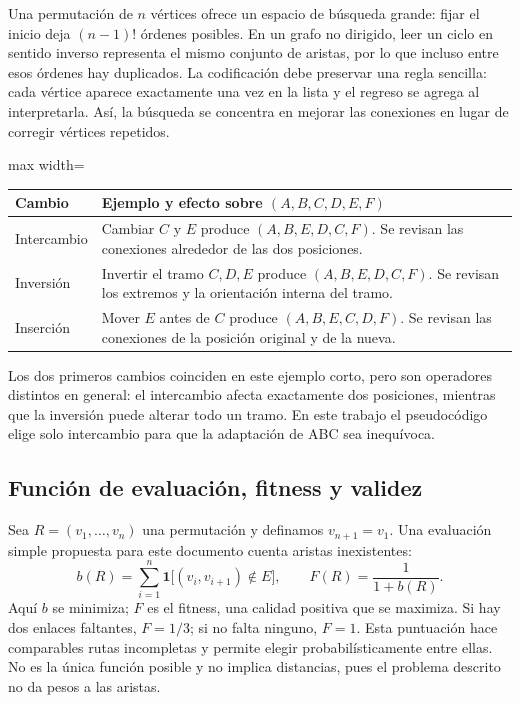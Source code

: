 Una permutación de $n$ vértices ofrece un espacio de búsqueda grande: fijar el inicio deja $(n-1)!$ órdenes posibles. En un grafo no dirigido, leer un ciclo en sentido inverso representa el mismo conjunto de aristas, por lo que incluso entre esos órdenes hay duplicados. La codificación debe preservar una regla sencilla: cada vértice aparece exactamente una vez en la lista y el regreso se agrega al interpretarla. Así, la búsqueda se concentra en mejorar las conexiones en lugar de corregir vértices repetidos.

\begin{center}

\begin{adjustbox}{max width=\linewidth}
\begin{tabular}{p{2.5cm}p{10.0cm}}
\toprule
Cambio & Ejemplo y efecto sobre $(A,B,C,D,E,F)$\\
\midrule
Intercambio & Cambiar $C$ y $E$ produce $(A,B,E,D,C,F)$. Se revisan las conexiones alrededor de las dos posiciones.\\
Inversión & Invertir el tramo $C,D,E$ produce $(A,B,E,D,C,F)$. Se revisan los extremos y la orientación interna del tramo.\\
Inserción & Mover $E$ antes de $C$ produce $(A,B,E,C,D,F)$. Se revisan las conexiones de la posición original y de la nueva.\\
\bottomrule
\end{tabular}
\end{adjustbox}
\end{center}

Los dos primeros cambios coinciden en este ejemplo corto, pero son operadores distintos en general: el intercambio afecta exactamente dos posiciones, mientras que la inversión puede alterar todo un tramo. En este trabajo el pseudocódigo elige solo intercambio para que la adaptación de ABC sea inequívoca.

\subsection{Función de evaluación, fitness y validez}
Sea $R=(v_1,\ldots,v_n)$ una permutación y definamos $v_{n+1}=v_1$. Una evaluación simple propuesta para este documento cuenta aristas inexistentes:
\begin{equation}
b(R)=\sum_{i=1}^{n}\mathbf{1}\bigl[(v_i,v_{i+1})\notin E\bigr],
\qquad F(R)=\frac{1}{1+b(R)}.\label{abc:eq:fitness}
\end{equation}
Aquí $b$ se minimiza; $F$ es el fitness, una calidad positiva que se maximiza. Si hay dos enlaces faltantes, $F=1/3$; si no falta ninguno, $F=1$. Esta puntuación hace comparables rutas incompletas y permite elegir probabilísticamente entre ellas. No es la única función posible y no implica distancias, pues el problema descrito no da pesos a las aristas.

